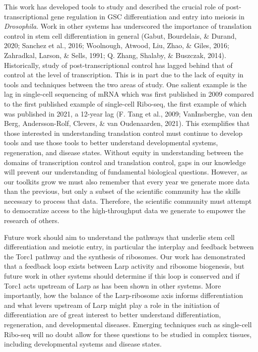 \documentclass[12pt,oneside]{reedthesis}
\begin{document}
This work has developed tools to study and described the crucial role of post-transcriptional gene regulation in GSC differentiation and entry into meiosis in \emph{Drosophila}. Work in other systems has underscored the importance of translation control in stem cell differentiation in general (Gabut, Bourdelais, \& Durand, 2020; Sanchez et al., 2016; Woolnough, Atwood, Liu, Zhao, \& Giles, 2016; Zahradkal, Larson, \& Sells, 1991; Q. Zhang, Shalaby, \& Buszczak, 2014). Historically, study of post-transcriptional control has lagged behind that of control at the level of transcription. This is in part due to the lack of equity in tools and techniques between the two areas of study. One salient example is the lag in single-cell sequencing of mRNA which was first published in 2009 compared to the first published example of single-cell Ribo-seq, the first example of which was published in 2021, a 12-year lag (F. Tang et al., 2009; VanInsberghe, van den Berg, Andersson-Rolf, Clevers, \& van Oudenaarden, 2021). This exemplifies that those interested in understanding translation control must continue to develop tools and use those tools to better understand developmental systems, regeneration, and disease states. Without equity in understanding between the domains of transcription control and translation control, gaps in our knowledge will prevent our understanding of fundamental biological questions. However, as our toolkits grow we must also remember that every year we generate more data than the previous, but only a subset of the scientific community has the skills necessary to process that data. Therefore, the scientific community must attempt to democratize access to the high-throughput data we generate to empower the research of others.

Future work should aim to understand the pathways that underlie stem cell differentiation and meiotic entry, in particular the interplay and feedback between the Torc1 pathway and the synthesis of ribosomes. Our work has demonstrated that a feedback loop exists between Larp activity and ribosome biogenesis, but future work in other systems should determine if this loop is conserved and if Torc1 acts upstream of Larp as has been shown in other systems. More importantly, how the balance of the Larp-ribosome axis informs differentiation and what levers upstream of Larp might play a role in the initiation of differentiation are of great interest to better understand differentiation, regeneration, and developmental diseases. Emerging techniques such as single-cell Ribo-seq will no doubt allow for these questions to be studied in complex tissues, including developmental systems and disease states.
\end{document}
